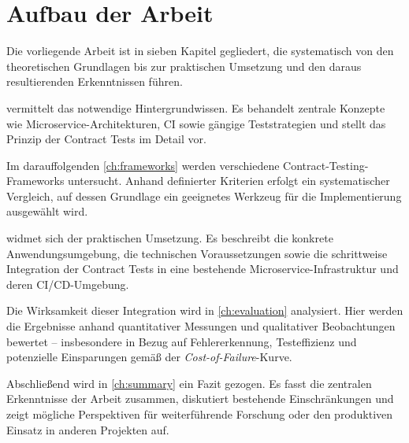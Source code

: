 \section{Aufbau der Arbeit}\label{sec:intro_structure}

Die vorliegende Arbeit ist in sieben Kapitel gegliedert, die systematisch von den theoretischen Grundlagen bis zur praktischen Umsetzung und den daraus resultierenden Erkenntnissen führen.

 vermittelt das notwendige Hintergrundwissen.
Es behandelt zentrale Konzepte wie Microservice-Architekturen, \glsdesc{CI} sowie gängige Teststrategien und stellt das Prinzip der Contract Tests im Detail vor.

Im darauffolgenden \cref{ch:frameworks} werden verschiedene Contract-Testing-Frameworks untersucht.
Anhand definierter Kriterien erfolgt ein systematischer Vergleich, auf dessen Grundlage ein geeignetes Werkzeug für die Implementierung ausgewählt wird.

 widmet sich der praktischen Umsetzung.
Es beschreibt die konkrete Anwendungsumgebung, die technischen Voraussetzungen sowie die schrittweise Integration der Contract Tests in eine bestehende Microservice-Infrastruktur und deren \gls{CI}/\gls{CD}-Umgebung.

Die Wirksamkeit dieser Integration wird in \cref{ch:evaluation} analysiert.
Hier werden die Ergebnisse anhand quantitativer Messungen und qualitativer Beobachtungen bewertet – insbesondere in Bezug auf Fehlererkennung, Testeffizienz und potenzielle Einsparungen gemäß der \textit{Cost-of-Failure}-Kurve.

Abschließend wird in \cref{ch:summary} ein Fazit gezogen.
Es fasst die zentralen Erkenntnisse der Arbeit zusammen, diskutiert bestehende Einschränkungen und zeigt mögliche Perspektiven für weiterführende Forschung oder den produktiven Einsatz in anderen Projekten auf.
